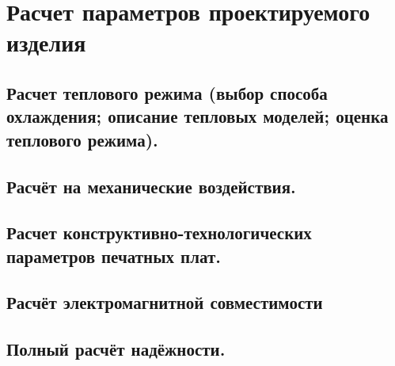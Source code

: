 \section{Расчет параметров проектируемого изделия}

\subsection{Расчет теплового режима (выбор способа охлаждения;
  описание тепловых моделей;  оценка теплового режима). }



\subsection{Расчёт на механические воздействия. }


\subsection{Расчет конструктивно-технологических параметров печатных плат. }


\subsection{Расчёт электромагнитной совместимости}


\subsection{Полный расчёт надёжности. }


